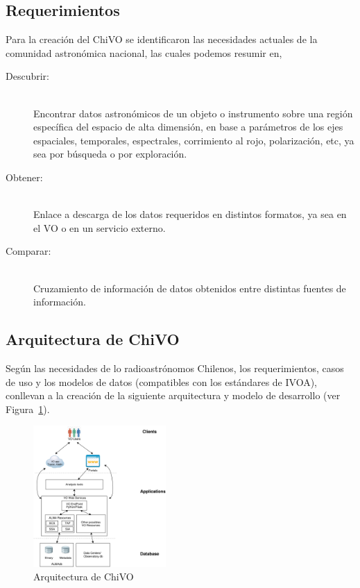\subsection{Requerimientos}

Para la creación del ChiVO se identificaron las necesidades actuales de la comunidad
astronómica nacional, las cuales podemos resumir en,

\begin{description}
    \item[Descubrir:] \hfill \\
        Encontrar datos astronómicos de un objeto o instrumento sobre una región
        específica del espacio de alta dimensión, en base a parámetros de los ejes
        espaciales, temporales, espectrales, corrimiento al rojo, polarización, etc,
        ya sea por búsqueda o por exploración.
    \item[Obtener:] \hfill \\
        Enlace a descarga de los datos requeridos en distintos formatos, ya sea en
        el VO o en un servicio externo.
    \item[Comparar:] \hfill \\
        Cruzamiento de información de datos obtenidos entre distintas fuentes de
        información.
\end{description}


\subsection{Arquitectura de ChiVO}

Según las necesidades de lo radioastrónomos Chilenos, los requerimientos, casos de
uso y los modelos de datos (compatibles con los estándares de IVOA),
conllevan a la creación de la siguiente arquitectura y modelo de desarrollo (ver
Figura~\ref{fig:chivoarch}).

\begin{figure}[ht]
    \centering
    \includegraphics[width=0.45\textwidth]{images/chivo_capas.png}
    \caption{Arquitectura de ChiVO}
    \label{fig:chivoarch}
\end{figure}

